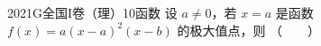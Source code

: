 
\begin{problem}{2021}{G}{全国I卷（理）}{10}{函数}
设 $ a\neq 0 $，若 $ x=a $ 是函数 $ f(x)=a(x-a)^2(x-b) $ 的极大值点，则 \hspace{1cm}（　　）
\begin{choices}
\end{choices}
\end{problem}

\begin{answer}

\end{answer}

\begin{solutions}

\end{solutions}